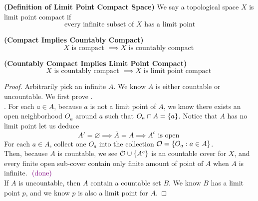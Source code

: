 \documentclass{report}
\begin{document}
\begin{definition}
\label{2.6.9}
\textbf{(Definition of Limit Point Compact Space)} We say a topological space $X$ is limit point compact if 
\begin{equation}
\text{every infinite subset of $X$ has a limit point}
\end{equation}
\end{definition}
\begin{theorem}
\label{2.6.10}
\textbf{(Compact Implies Countably Compact)} 
\begin{equation}
 X\text{ is compact }\implies X\text{ is countably compact }
\end{equation}
\end{theorem}
\begin{theorem}
\label{2.6.11}
\textbf{(Countably Compact Implies Limit Point Compact)} 
\begin{equation}
X\text{ is countably compact }\implies X\text{ is limit point compact }
\end{equation}
\end{theorem}
\begin{proof}
Arbitrarily pick an infinite $A$. We know  $A$ is either countable or uncountable. We first prove  .\\

. For each $a\in A$, because $a$ is not a limit point of $A$, we know there exists an open neighborhood  $O_a$ around $a$ such that  $O_a\cap A=\{ a \}$. Notice that $A$ has no limit point let us deduce
\begin{equation}
A'=\varnothing \implies \overline{A}=A\implies A^c\text{ is open }
\end{equation}
For each $a\in A$, collect one $O_a$ into the collection $\mathcal{O}=\{ O_a:a\in A \}$.\\

Then, because $A$ is countable, we see $\mathcal{O}\cup \{ A^c \}$ is an countable cover for $X$, and every finite open sub-cover contain only finite amount of point of $A$ when  $A$ is infinite. \CaC $\textcolor{violet}{\text{ (done) }}$\\

If $A$ is uncountable, then  $A$ contain a countable set  $B$. We know  $B$ has a limit point  $p$, and we know  $p$ is also a limit point for $A$.
\end{proof}
\end{document}
